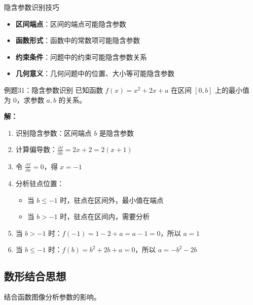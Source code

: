 \documentclass[a4paper,11pt]{ctexart}
\newcommand{\partialder}[2]{\frac{\partial #1}{\partial #2}}
\theoremstyle{definition}
\theoremstyle{remark}
\begin{document}
\begin{conceptbox}{隐含参数识别技巧}
\begin{itemize}
    \item \textbf{区间端点}：区间的端点可能隐含参数
    \item \textbf{函数形式}：函数中的常数项可能隐含参数
    \item \textbf{约束条件}：问题中的约束可能隐含参数关系
    \item \textbf{几何意义}：几何问题中的位置、大小等可能隐含参数
\end{itemize}
\end{conceptbox}

\begin{examplebox}{例题31：隐含参数识别}
已知函数 $f(x) = x^2 + 2x + a$ 在区间 $[0, b]$ 上的最小值为 0，求参数 $a, b$ 的关系。

\textbf{解：}
\begin{enumerate}
    \item 识别隐含参数：区间端点 $b$ 是隐含参数
    \item 计算偏导数：$\partialder{f}{x} = 2x + 2 = 2(x + 1)$
    \item 令 $\partialder{f}{x} = 0$，得 $x = -1$
    \item 分析驻点位置：
    \begin{itemize}
        \item 当 $b \leq -1$ 时，驻点在区间外，最小值在端点
        \item 当 $b > -1$ 时，驻点在区间内，需要分析
    \end{itemize}
    \item 当 $b > -1$ 时：$f(-1) = 1 - 2 + a = a - 1 = 0$，所以 $a = 1$
    \item 当 $b \leq -1$ 时：$f(b) = b^2 + 2b + a = 0$，所以 $a = -b^2 - 2b$
\end{enumerate}
\end{examplebox}

\subsection{数形结合思想}

结合函数图像分析参数的影响。
\end{document}
